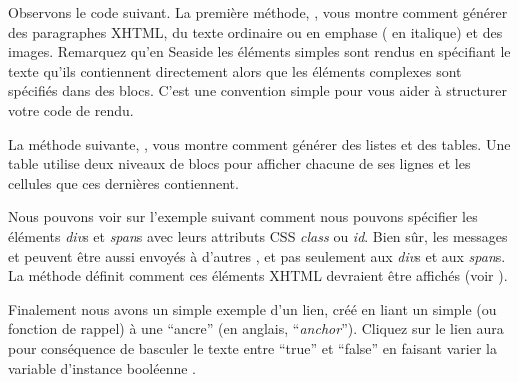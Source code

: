 \documentclass[a4paper,10pt,twoside]{book}
\begin{document}

Observons le code suivant.
La première méthode, , vous
montre comment générer des paragraphes XHTML, du texte ordinaire ou en
emphase (\ie{} en italique) et des images.
Remarquez qu'en Seaside les éléments simples sont rendus en spécifiant
le texte qu'ils contiennent directement alors que les éléments
complexes sont spécifiés dans des blocs.
C'est une convention simple pour vous aider à structurer votre code de
rendu.


La méthode suivante, ,
vous montre comment générer des listes et des tables.
Une table utilise deux niveaux de blocs pour afficher chacune
de ses lignes et les cellules que ces dernières contiennent.


Nous pouvons voir sur l'exemple suivant comment nous pouvons spécifier
les éléments \emph{div}s et \emph{span}s avec leurs attributs CSS
\emph{class} ou \emph{id}.
Bien sûr, les messages  et  peuvent être aussi
envoyés à d'autres \brushes, et pas seulement aux \emph{div}s et aux
\emph{span}s.
La méthode  définit comment ces éléments
XHTML devraient être affichés (voir ).


Finalement nous avons un simple exemple d'un lien, créé en liant un
simple  (ou fonction de rappel) à une
``ancre'' (en anglais, ``\emph{anchor}'').
Cliquez sur le lien aura pour conséquence de basculer le texte entre
``true'' et ``false'' en faisant varier la variable d'instance
booléenne .


\end{document}
